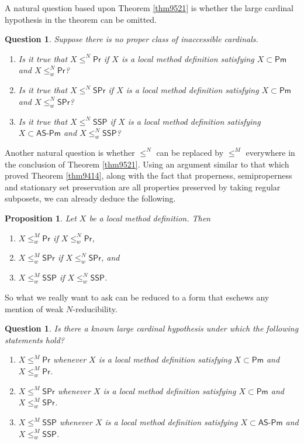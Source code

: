 \documentclass[12pt, twoside]{memoir}
\numberwithin{equation}{section}
\newtheorem{prop}[thm]{Proposition}
\newtheorem{ques}[thm]{Question}
\theoremstyle{definition}
\theoremstyle{remark}
\theoremstyle{definition}
\theoremstyle{definition}
\theoremstyle{definition}
\theoremstyle{remark}
\begin{document}
A natural question based upon Theorem \ref{thm9521} is whether the large cardinal hypothesis in the theorem can be omitted.

\begin{ques}
Suppose there is no proper class of inaccessible cardinals.
\begin{enumerate}[label=(\arabic*)]
    \item Is it true that $X \leq^N \mathsf{Pr}$ if $X$ is a local method definition satisfying $X \subset \mathsf{Pm}$ and $X \leq^N_w \mathsf{Pr}$?
    \item Is it true that $X \leq^N \mathsf{SPr}$ if $X$ is a local method definition satisfying $X \subset \mathsf{Pm}$ and $X \leq^N_w \mathsf{SPr}$?
    \item Is it true that $X \leq^N \mathsf{SSP}$ if $X$ is a local method definition satisfying $X \subset \mathsf{AS\text{-}Pm}$ and $X \leq^N_w \mathsf{SSP}$?
\end{enumerate}
\end{ques}

Another natural question is whether $\leq^N$ can be replaced by $\leq^M$ everywhere in the conclusion of Theorem \ref{thm9521}. Using an argument similar to that which proved Theorem \ref{thm9414}, along with the fact that properness, semiproperness and stationary set preservation are all properties preserved by taking regular subposets, we can already deduce the following.

\begin{prop}
Let $X$ be a local method definition. Then 
\begin{enumerate}[label=(\arabic*)]
    \item $X \leq^M_w \mathsf{Pr}$ if $X \leq^N_w \mathsf{Pr}$,
    \item $X \leq^M_w \mathsf{SPr}$ if $X \leq^N_w \mathsf{SPr}$, and
    \item $X \leq^M_w \mathsf{SSP}$ if $X \leq^N_w \mathsf{SSP}$.
\end{enumerate}
\end{prop}

So what we really want to ask can be reduced to a form that eschews any mention of weak $N$-reducibility.

\begin{ques}
Is there a known large cardinal hypothesis under which the following statements hold?
\begin{enumerate}[label=(\arabic*)]
    \item $X \leq^M \mathsf{Pr}$ whenever $X$ is a local method definition satisfying $X \subset \mathsf{Pm}$ and $X \leq^M_w \mathsf{Pr}$.
    \item $X \leq^M \mathsf{SPr}$ whenever $X$ is a local method definition satisfying $X \subset \mathsf{Pm}$ and $X \leq^M_w \mathsf{SPr}$.
    \item $X \leq^M \mathsf{SSP}$ whenever $X$ is a local method definition satisfying $X \subset \mathsf{AS\text{-}Pm}$ and $X \leq^M_w \mathsf{SSP}$.
\end{enumerate}
\end{ques}
\end{document}
